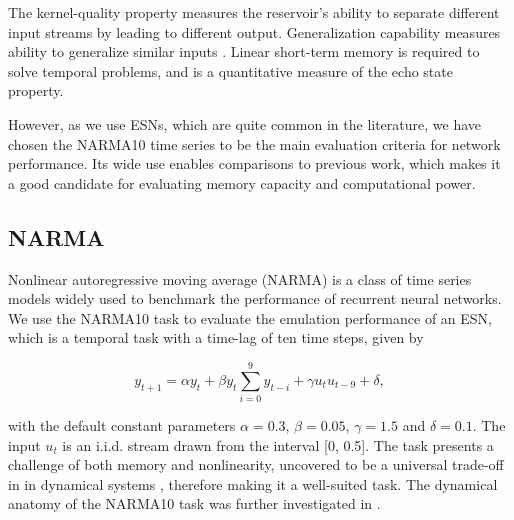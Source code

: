 The kernel-quality property \cite{legenstein_edge_2007} measures the reservoir's
ability to separate different input streams by leading to different output.
Generalization capability measures ability to generalize similar inputs
\cite{legenstein_edge_2007}. Linear short-term memory \cite{jaeger_short_2002}
is required to solve temporal problems, and is a quantitative measure of the
echo state property.

However, as we use ESNs, which are quite common in the literature, we have
chosen the NARMA10 time series to be the main evaluation criteria for network
performance. Its wide use enables comparisons to previous work, which makes it a
good candidate for evaluating memory capacity and computational power.

\subsection{NARMA}

Nonlinear autoregressive moving average (NARMA) \cite{atiya_new_2000} is a class
of time series models widely used to benchmark the performance of recurrent
neural networks. We use the NARMA10 task to evaluate the emulation performance
of an ESN, which is a temporal task with a time-lag of ten time steps, given by


\begin{equation}
  y_{t+1} = \alpha y_{t} +
  \beta y_{t} \sum_{i=0}^{9}y_{t-i} +
  \gamma u_{t}u_{t-9} +
  \delta,
  \label{narma}
\end{equation}

\noindent with the default constant parameters $\alpha = 0.3$, $\beta = 0.05$,
$\gamma = 1.5$ and $\delta = 0.1$. The input $u_{t}$ is an i.i.d. stream drawn
from the interval [0, 0.5]. The task presents a challenge of both memory and
nonlinearity, uncovered to be a universal trade-off in in dynamical systems
\cite{dambre_information_2012, verstraeten_memory_2010}, therefore making it a
well-suited task. The dynamical anatomy of the NARMA10 task was further
investigated in \cite{kubota_dynamical_2019}.




